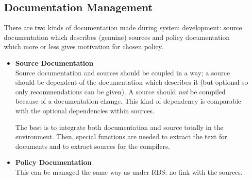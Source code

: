 \subsection{Documentation Management}
 There are two kinds of documentation made during system development: source 
 documentation which describes (genuine) sources and policy documentation which 
 more or less gives motivation for chosen policy.
 \begin{itemize}
   \item {\bf Source Documentation}\\
         Source documentation and sources should be 
         coupled in a way; a source should be dependent of the documentation 
         which describes it (but optional so only recommendations can be given).
         A source should {\em not}\/ be compiled because of a documentation 
         change. This kind of dependency is comparable with the optional 
         dependencies within sources.

         The best is to integrate both documentation and source totally in the 
         environment. Then, special functions are needed to extract the text for
         documents and to extract sources for the compilers.
   \item {\bf Policy Documentation}\\
         This can be managed the same way as under 
         RBS: no link with the sources.
 \end{itemize}
